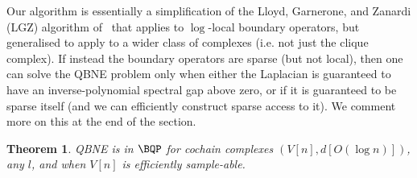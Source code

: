 \documentclass[11pt]{article}
\numberwithin{equation}{section}
\renewcommand\( {\left(}
\renewcommand\) {\right)}
\newtheorem{thm}{Theorem}
\begin{document}
Our algorithm is essentially a simplification of the Lloyd, Garnerone, and Zanardi (LGZ) algorithm of~\cite{LloydetalTDA} that applies to $\log$-local boundary operators, but generalised to apply to a wider class of complexes (i.e. not just the clique complex). If instead the boundary operators are sparse (but not local), then one can solve the {\sc QBNE} problem only when either the Laplacian is guaranteed to have an inverse-polynomial spectral gap above zero, or if it is guaranteed to be sparse itself (and we can efficiently construct sparse access to it). We comment more on this at the end of the section.


\begin{thm}\label{theo:inBQP}
	{\sc QBNE} is in $\BQP$ for cochain complexes $(V[n],d[O(\log n)])$, any $l$, and when $V[n]$ is efficiently sample-able. 
\end{thm}
\end{document}
